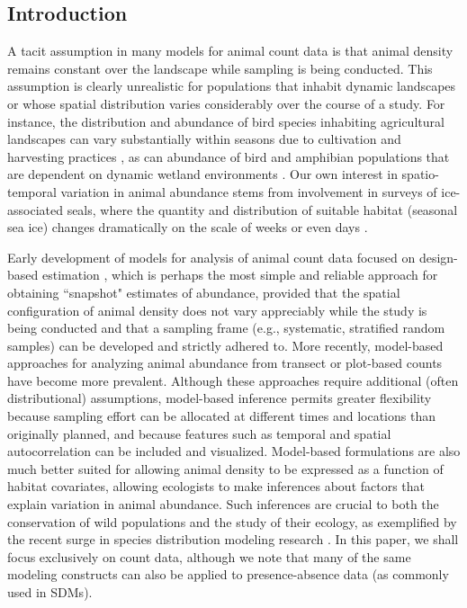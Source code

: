 \documentclass[12pt,english]{article}
\begin{document}
\begin{spacing}{1.9}
\def\VAR{{\rm Var}\,}
\def\COV{{\rm Cov}\,}
\def\Prob{{\rm P}\,}



\section{Introduction}

A tacit assumption in many models for animal count data is that animal density remains constant over
the landscape while sampling is being conducted.  This assumption is clearly unrealistic for populations that inhabit dynamic landscapes or whose spatial distribution varies considerably over the course of a study. For instance, the distribution and abundance of bird species inhabiting agricultural landscapes can vary substantially within seasons due to cultivation and harvesting practices \citep{MillerEtAl11jwm}, as can abundance of bird and amphibian populations that are dependent on dynamic wetland environments \citep{MurkinEtAl1997,BabbittTanner2000}.   Our own interest in spatio-temporal variation in animal abundance stems from involvement in surveys of ice-associated seals, where the quantity and distribution of suitable habitat (seasonal sea ice) changes dramatically on the scale of weeks or even days \citep{VerHoefJansen2007,VerHoefEtAl2014}.

Early development of models for analysis of animal count data \citep[see][and references therein]{BucklandEtAl2001} focused on design-based estimation \citep[cf.][]{Cochran1977}, which is perhaps the most simple and reliable approach for obtaining ``snapshot" estimates of abundance, provided that the spatial configuration of animal density does not vary appreciably while the study is being conducted and that a sampling frame (e.g., systematic, stratified random samples) can be developed and strictly adhered to.  More recently, model-based approaches for analyzing animal abundance from transect or plot-based counts \citep{HedleyBuckland2004,VerHoefJansen2007,JohnsonEtAl2010} have become more prevalent. Although these approaches require additional (often distributional) assumptions, model-based inference permits greater flexibility because sampling effort can be allocated at different times and locations than originally planned, and because features such as temporal \citep{Moore2011} and spatial \citep{MillerEtAl2013} autocorrelation can be included and visualized.  Model-based formulations are also much better suited for allowing animal density to be expressed as a function of habitat covariates, allowing ecologists to make inferences about factors that explain variation in animal abundance.  Such inferences are crucial to both the conservation of wild populations and the study of their ecology, as exemplified by the recent surge in species distribution modeling research \citep[SDMs;][]{GuisanThuiller2005,ElithLeathwick2009}.  In this paper, we shall focus exclusively on count data, although we note that many of the same modeling constructs can also be applied to presence-absence data (as commonly used in SDMs).


\end{spacing}
\end{document}
